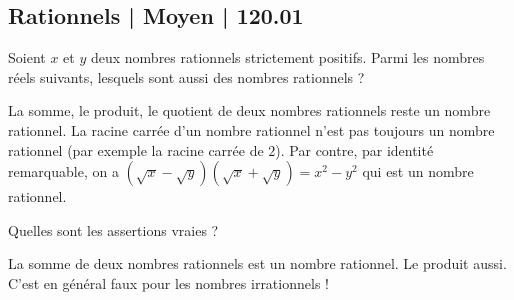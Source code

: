 \subsection{Rationnels | Moyen | 120.01}

\begin{question}

Soient $x$ et $y$ deux nombres rationnels strictement positifs.
Parmi les nombres réels suivants, lesquels sont aussi des nombres rationnels ?
\begin{answers}



   
\end{answers}
\begin{explanations}
La somme, le produit, le quotient de deux nombres rationnels reste un nombre rationnel. La racine carrée d'un nombre rationnel n'est pas toujours un nombre rationnel (par exemple la racine carrée de $2$). Par contre, par identité remarquable, on a $(\sqrt{x}-\sqrt{y})(\sqrt{x}+\sqrt{y}) = x^2-y^2$ qui est un nombre rationnel.
\end{explanations}
\end{question}


\begin{question}

Quelles sont les assertions vraies ?
\begin{answers}



\end{answers}
\begin{explanations}
La somme de deux nombres rationnels est un nombre rationnel. Le produit aussi.
C'est en général faux pour les nombres irrationnels !
\end{explanations}
\end{question}



